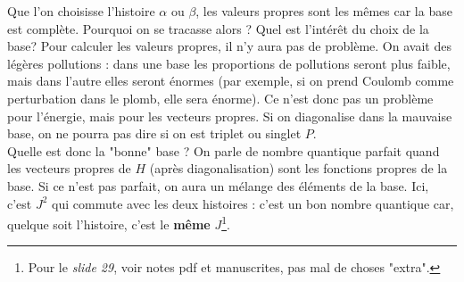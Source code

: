 Que l'on choisisse l'histoire $\alpha$ ou $\beta$, les valeurs propres sont les mêmes car la base
est complète. Pourquoi on se tracasse alors ? Quel est l'intérêt du choix de la base? Pour calculer
les valeurs propres, il n'y aura pas de problème. On avait des légères pollutions : dans une base
les proportions de pollutions seront plus faible, mais dans l'autre elles seront énormes (par 
exemple, si on prend Coulomb comme perturbation dans le plomb, elle sera énorme). Ce n'est donc
pas un problème pour l'énergie, mais pour les vecteurs propres. Si on diagonalise dans la mauvaise
base, on ne pourra pas dire si on est triplet ou singlet $P$.\\

Quelle est donc la "bonne" base ? On parle de nombre quantique parfait quand les vecteurs propres
de $H$ (après diagonalisation) sont les fonctions propres de la base. Si ce n'est pas parfait, on 
aura un mélange des éléments de la base. Ici, c'est $J^2$ qui commute avec les deux histoires : 
c'est un bon nombre quantique car, quelque soit l'histoire, c'est le \textbf{même} 
$J$\footnote{Pour le \textit{slide 29}, voir notes pdf et manuscrites, pas mal de choses "extra".}.\\

